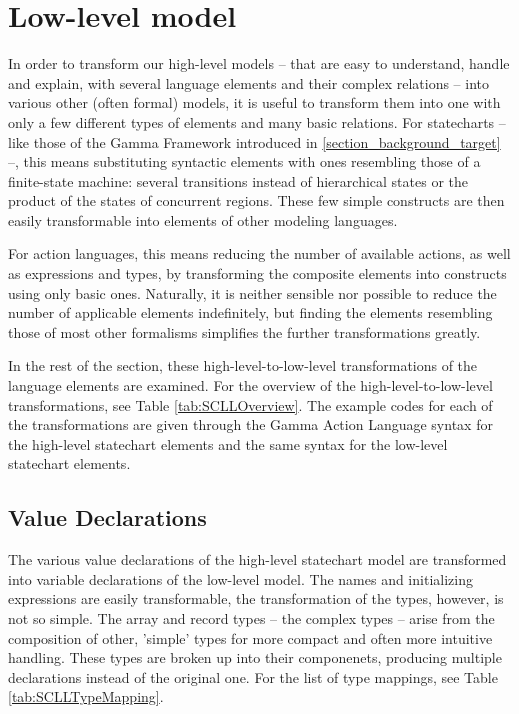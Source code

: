 \section{Low-level model} \label{section_tr_lowlevel}
In order to transform our high-level models -- that are easy to understand, handle and explain, with several language elements and their complex relations -- into various other (often formal) models, it is useful to transform them into one with only a few different types of elements and many basic relations. For statecharts -- like those of the Gamma Framework introduced in \ref{section_background_target} --, this means substituting syntactic elements with ones resembling those of a finite-state machine: several transitions instead of hierarchical states or the product of the states of concurrent regions. These few simple constructs are then easily transformable into elements of other modeling languages.

For action languages, this means reducing the number of available actions, as well as expressions and types, by transforming the composite elements into constructs using only basic ones. Naturally, it is neither sensible nor possible to reduce the number of applicable elements indefinitely, but finding the elements resembling those of most other formalisms simplifies the further transformations greatly. 

In the rest of the section, these high-level-to-low-level transformations of the language elements are examined. For the overview of the high-level-to-low-level transformations, see Table \ref{tab:SCLLOverview}. The example codes for each of the transformations are given through the Gamma Action Language syntax for the high-level statechart elements and the same syntax for the low-level statechart elements.

\subsection{Value Declarations}
The various value declarations of the high-level statechart model are transformed into variable declarations of the low-level model. The names and initializing expressions are easily transformable, the transformation of the types, however, is not so simple. The array and record types -- the complex types -- arise from the composition of other, 'simple' types for more compact and often more intuitive handling. These types are broken up into their componenets, producing multiple declarations instead of the original one. For the list of type mappings, see Table \ref{tab:SCLLTypeMapping}.	

